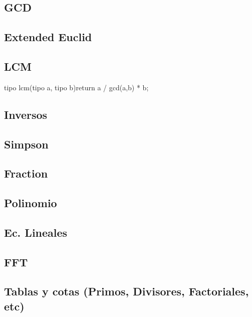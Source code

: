 \subsection{GCD}
\subsection{Extended Euclid}
\subsection{LCM}
\begin{code}
tipo lcm(tipo a, tipo b){return a / gcd(a,b) * b;}
\end{code}
\subsection{Inversos}
\subsection{Simpson}
\subsection{Fraction}
\subsection{Polinomio}
\subsection{Ec. Lineales}
\subsection{FFT}
\subsection{Tablas y cotas (Primos, Divisores, Factoriales, etc)}
